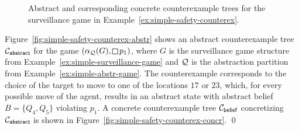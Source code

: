 \begin{figure}
\hfill
{}
\caption{Abstract and corresponding concrete counterexample trees for the surveillance game in Example~\ref{ex:simple-safety-counterex}.}
\label{fig:simple-safety-counterex}
\vspace{-.5cm}
\end{figure}

\begin{example}\label{ex:simple-safety-counterex}
Figure~\ref{fig:simple-safety-counterex-abstr} shows an abstract counterexample tree $\mathcal{C}_{\mathsf{abstract}}$ for the game $(\alpha_\part(G),\LTLglobally p_1)$, where $G$ is the surveillance game structure from Example~\ref{ex:simple-surveillance-game} and $\mathcal{Q}$ is the abstraction partition from Example~\ref{ex:simple-abstr-game}. The counterexample corresponds to the choice of the target to move to one of the locations $17$ or $23$, which, for every possible move of the agent, results in an abstract state with abstract belief $B = \{Q_4,Q_5\}$ violating $p_1$.
A concrete counterexample tree $\mathcal{C}_{\mathsf{belief}}$ concretizing $\mathcal{C}_{\mathsf{abstract}}$ is shown in Figure~\ref{fig:simple-safety-counterex-concr}.
\qed
\end{example}
